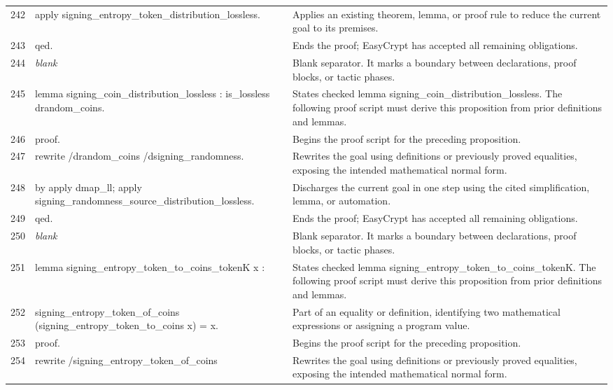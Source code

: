 \documentclass[10pt]{article}
\begin{document}
\begin{longtable}{r L{0.53\textwidth} L{0.37\textwidth}}
242 & {\ttfamily\scriptsize    apply signing\_entropy\_token\_distribution\_lossless.} & Applies an existing theorem, lemma, or proof rule to reduce the current goal to its premises. \\
243 & {\ttfamily\scriptsize qed.} & Ends the proof; EasyCrypt has accepted all remaining obligations. \\
244 & {\ttfamily\scriptsize \emph{blank}} & Blank separator.  It marks a boundary between declarations, proof blocks, or tactic phases. \\
245 & {\ttfamily\scriptsize lemma signing\_coin\_distribution\_lossless : is\_lossless drandom\_coins.} & States checked lemma signing\_coin\_distribution\_lossless.  The following proof script must derive this proposition from prior definitions and lemmas. \\
246 & {\ttfamily\scriptsize proof.} & Begins the proof script for the preceding proposition. \\
247 & {\ttfamily\scriptsize rewrite /drandom\_coins /dsigning\_randomness.} & Rewrites the goal using definitions or previously proved equalities, exposing the intended mathematical normal form. \\
248 & {\ttfamily\scriptsize by apply dmap\_ll; apply signing\_randomness\_source\_distribution\_lossless.} & Discharges the current goal in one step using the cited simplification, lemma, or automation. \\
249 & {\ttfamily\scriptsize qed.} & Ends the proof; EasyCrypt has accepted all remaining obligations. \\
250 & {\ttfamily\scriptsize \emph{blank}} & Blank separator.  It marks a boundary between declarations, proof blocks, or tactic phases. \\
251 & {\ttfamily\scriptsize lemma signing\_entropy\_token\_to\_coins\_tokenK x :} & States checked lemma signing\_entropy\_token\_to\_coins\_tokenK.  The following proof script must derive this proposition from prior definitions and lemmas. \\
252 & {\ttfamily\scriptsize   signing\_entropy\_token\_of\_coins (signing\_entropy\_token\_to\_coins x) = x.} & Part of an equality or definition, identifying two mathematical expressions or assigning a program value. \\
253 & {\ttfamily\scriptsize proof.} & Begins the proof script for the preceding proposition. \\
254 & {\ttfamily\scriptsize rewrite /signing\_entropy\_token\_of\_coins} & Rewrites the goal using definitions or previously proved equalities, exposing the intended mathematical normal form. \\

\end{longtable}
\end{document}
